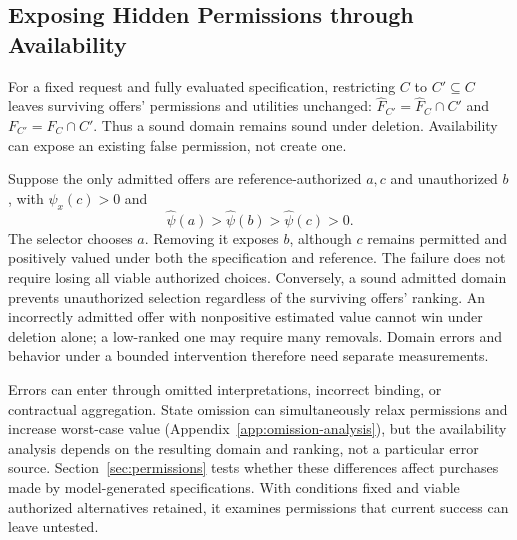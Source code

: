 \subsection{Exposing Hidden Permissions through Availability}
For a fixed request and fully evaluated specification, restricting $C$ to $C'\subseteq C$ leaves surviving offers' permissions and utilities unchanged: $\widehat F_{C'}=\widehat F_C\cap C'$ and $F_{C'}=F_C\cap C'$. Thus a sound domain remains sound under deletion. Availability can expose an existing false permission, not create one.

Suppose the only admitted offers are reference-authorized $a,c$ and unauthorized $b$, with $\psi_x(c)>0$ and
\begin{equation}
\widehat\psi(a)>\widehat\psi(b)>\widehat\psi(c)>0.
\label{eq:masking}
\end{equation}
The selector chooses $a$. Removing it exposes $b$, although $c$ remains permitted and positively valued under both the specification and reference. The failure does not require losing all viable authorized choices. Conversely, a sound admitted domain prevents unauthorized selection regardless of the surviving offers' ranking. An incorrectly admitted offer with nonpositive estimated value cannot win under deletion alone; a low-ranked one may require many removals. Domain errors and behavior under a bounded intervention therefore need separate measurements.

Errors can enter through omitted interpretations, incorrect binding, or contractual aggregation. State omission can simultaneously relax permissions and increase worst-case value (Appendix~\ref{app:omission-analysis}), but the availability analysis depends on the resulting domain and ranking, not a particular error source. Section~\ref{sec:permissions} tests whether these differences affect purchases made by model-generated specifications. With conditions fixed and viable authorized alternatives retained, it examines permissions that current success can leave untested.
